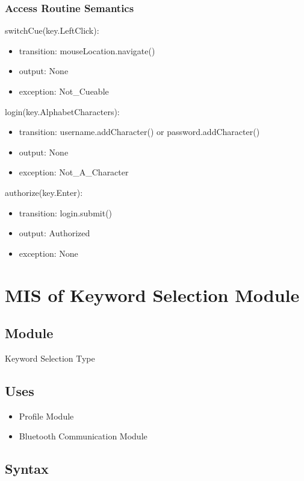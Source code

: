\documentclass[12pt, titlepage]{article}
\begin{document}
\subsubsection{Access Routine Semantics}

\noindent switchCue(key.LeftClick):
\begin{itemize}
\item transition: mouseLocation.navigate() 
\item output: None
\item exception: Not\_Cueable 
\end{itemize}

\noindent login(key.AlphabetCharacters):
\begin{itemize}
\item transition: username.addCharacter() or password.addCharacter()
\item output: None
\item exception: Not\_A\_Character 
\end{itemize}


\noindent authorize(key.Enter):
\begin{itemize}
\item transition: login.submit() 
\item output: Authorized
\item exception: None 
\end{itemize}

\newpage 

\section{MIS of Keyword Selection Module} \label{Keyword Selection Module}
\subsection{Module}
Keyword Selection Type

\subsection{Uses}
\begin{itemize}
  \item Profile Module
  \item Bluetooth Communication Module
  \end{itemize}

\subsection{Syntax}
\end{document}

